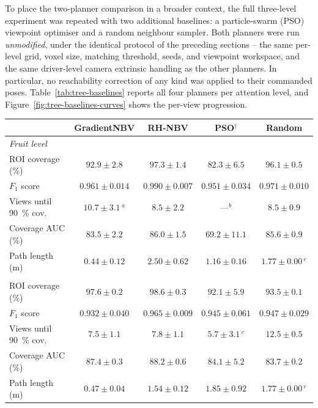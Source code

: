 To place the two-planner comparison in a broader context, the full
three-level experiment was repeated with two additional baselines: a
particle-swarm (PSO) viewpoint optimiser and a random neighbour sampler.
Both planners were run \emph{unmodified}, under the identical protocol of
the preceding sections -- the same per-level grid, voxel size, matching
threshold, seeds, and viewpoint workspace, and the same driver-level
camera extrinsic handling as the other planners. In particular, no
reachability correction of any kind was applied to their commanded poses.
Table~\ref{tab:tree-baselines} reports all four planners per attention
level, and Figure~\ref{fig:tree-baselines-curves} shows the per-view
progression.

\begin{table}[t]
\centering
\begin{tabular}{lcccc}
\toprule
 & GradientNBV & RH-NBV & PSO$^{\dagger}$ & Random \\
\midrule
\multicolumn{5}{l}{\itshape Fruit level} \\
\quad ROI coverage (\%)   & $92.9 \pm 2.8$ & $\mathbf{97.3 \pm 1.4}$ & $82.3 \pm 6.5$ & $96.1 \pm 0.5$ \\
\quad $F_1$ score         & $0.961 \pm 0.014$ & $\mathbf{0.990 \pm 0.007}$ & $0.951 \pm 0.034$ & $0.971 \pm 0.010$ \\
\quad Views until \SI{90}{\percent} cov. & $10.7 \pm 3.1$\,$^{a}$ & $\mathbf{8.5 \pm 2.2}$ & ---$^{b}$ & $\mathbf{8.5 \pm 0.9}$ \\
\quad Coverage AUC (\%)   & $83.5 \pm 2.2$ & $\mathbf{86.0 \pm 1.5}$ & $69.2 \pm 11.1$ & $85.6 \pm 0.9$ \\
\quad Path length (m)     & $\mathbf{0.44 \pm 0.12}$ & $2.50 \pm 0.62$ & $1.16 \pm 0.16$ & $1.77 \pm 0.00$\,$^{e}$ \\
\addlinespace
\multicolumn{5}{l}{\itshape Blossom level} \\
\quad ROI coverage (\%)   & $97.6 \pm 0.2$ & $\mathbf{98.6 \pm 0.3}$ & $92.1 \pm 5.9$ & $93.5 \pm 0.1$ \\
\quad $F_1$ score         & $0.932 \pm 0.040$ & $\mathbf{0.965 \pm 0.009}$ & $0.945 \pm 0.061$ & $0.947 \pm 0.029$ \\
\quad Views until \SI{90}{\percent} cov. & $\mathbf{7.5 \pm 1.1}$ & $7.8 \pm 1.1$ & $5.7 \pm 3.1$\,$^{c}$ & $12.5 \pm 0.5$ \\
\quad Coverage AUC (\%)   & $87.4 \pm 0.3$ & $\mathbf{88.2 \pm 0.6}$ & $84.1 \pm 5.2$ & $83.7 \pm 0.2$ \\
\quad Path length (m)     & $\mathbf{0.47 \pm 0.04}$ & $1.54 \pm 0.12$ & $1.85 \pm 0.92$ & $1.77 \pm 0.00$\,$^{e}$ \\

\end{tabular}
\end{table}
